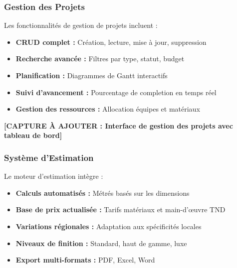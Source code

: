 \subsubsection{Gestion des Projets}

Les fonctionnalités de gestion de projets incluent :

\begin{itemize}
    \item \textbf{CRUD complet :} Création, lecture, mise à jour, suppression
    \item \textbf{Recherche avancée :} Filtres par type, statut, budget
    \item \textbf{Planification :} Diagrammes de Gantt interactifs
    \item \textbf{Suivi d'avancement :} Pourcentage de completion en temps réel
    \item \textbf{Gestion des ressources :} Allocation équipes et matériaux
\end{itemize}

\textbf{[CAPTURE À AJOUTER : Interface de gestion des projets avec tableau de bord]}

\subsubsection{Système d'Estimation}

Le moteur d'estimation intègre :

\begin{itemize}
    \item \textbf{Calculs automatisés :} Métrés basés sur les dimensions
    \item \textbf{Base de prix actualisée :} Tarifs matériaux et main-d'œuvre TND
    \item \textbf{Variations régionales :} Adaptation aux spécificités locales
    \item \textbf{Niveaux de finition :} Standard, haut de gamme, luxe
    \item \textbf{Export multi-formats :} PDF, Excel, Word
\end{itemize}

